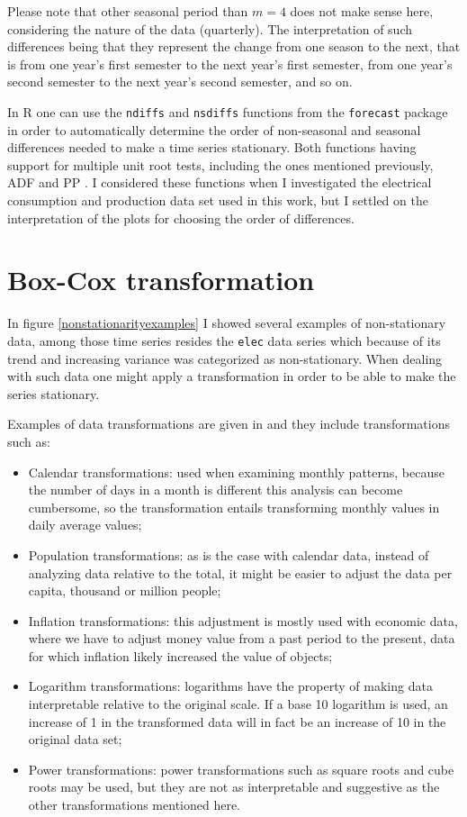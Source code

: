\documentclass[12pt,a4paper,titlepage]{report}
\begin{document}
Please note that other seasonal period than $ m = 4 $ does not make sense here, considering the nature of the data (quarterly). The interpretation of such differences being that they represent the change from one season to the next, that is from one year's first semester to the next year's first semester, from one year's second semester to the next year's second semester, and so on.

In R one can use the \texttt{ndiffs} and \texttt{nsdiffs} functions from the \texttt{forecast} package in order to automatically determine the order of non-seasonal and seasonal differences needed to make a time series stationary. Both functions having support for multiple unit root tests, including the ones mentioned previously, ADF \cite{adftest} and PP \cite{unitroottestsPhillips}. I considered these functions when I investigated the electrical consumption and production data set used in this work, but I settled on the interpretation of the plots for choosing the order of differences.

\section{Box-Cox transformation} \label{boxcoxtransformation}

In figure \ref{nonstationarityexamples} I showed several examples of non-stationary data, among those time series resides the \texttt{elec} data series which because of its trend and increasing variance was categorized as non-stationary. When dealing with such data one might apply a transformation in order to be able to make the series stationary.

Examples of data transformations are given in \cite{fpp2transformations} and they include transformations such as:
\begin{itemize}
    \item Calendar transformations: used when examining monthly patterns, because the number of days in a month is different this analysis can become cumbersome, so the transformation entails transforming monthly values in daily average values;
    \item Population transformations: as is the case with calendar data, instead of analyzing data relative to the total, it might be easier to adjust the data per capita, thousand or million people;
    \item Inflation transformations: this adjustment is mostly used with economic data, where we have to adjust money value from a past period to the present, data for which inflation likely increased the value of objects;
    \item Logarithm transformations: logarithms have the property of making data interpretable relative to the original scale. If a base 10 logarithm is used, an increase of 1 in the transformed data will in fact be an increase of 10 in the original data set;
    \item Power transformations: power transformations such as square roots and cube roots may be used, but they are not as interpretable and suggestive as the other transformations mentioned here.
\end{itemize}
\end{document}
